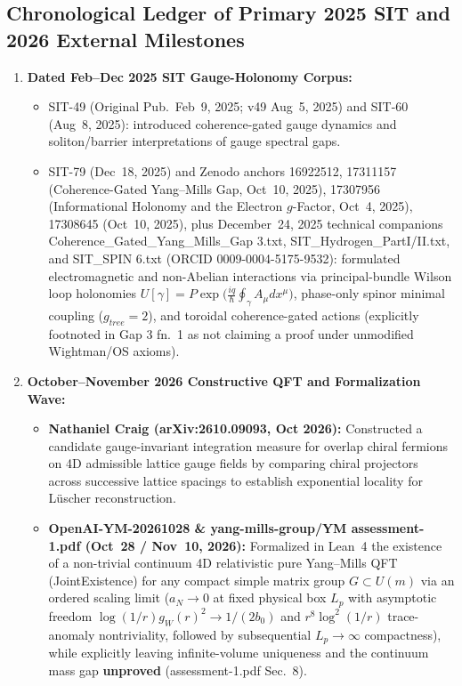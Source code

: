 \documentclass[american,11pt,letterpaper]{article}
\def\mathcal#1{#1}%
\def\mathrm#1{#1}%
\def\texttt#1{#1}%
\def\emph#1{#1}%
\begin{document}
\subsection{Chronological Ledger of Primary 2025 SIT and 2026 External Milestones}

\begin{enumerate}[leftmargin=2em]
  \item \textbf{Dated Feb--Dec 2025 SIT Gauge-Holonomy Corpus:}
  \begin{itemize}
    \item \texttt{SIT-49} (Original Pub.\ Feb~9, 2025; v49 Aug~5, 2025) and \texttt{SIT-60} (Aug~8, 2025): introduced coherence-gated gauge dynamics and soliton/barrier interpretations of gauge spectral gaps.
    \item \texttt{SIT-79} (Dec~18, 2025) and Zenodo anchors \texttt{16922512}, \texttt{17311157} (\emph{Coherence-Gated Yang--Mills Gap}, Oct~10, 2025), \texttt{17307956} (\emph{Informational Holonomy and the Electron $g$-Factor}, Oct~4, 2025), \texttt{17308645} (Oct~10, 2025), plus December~24, 2025 technical companions \texttt{Coherence\_\allowbreak{}Gated\_\allowbreak{}Yang\_\allowbreak{}Mills\_\allowbreak{}Gap 3.\allowbreak{}txt}, \texttt{SIT\_\allowbreak{}Hydrogen\_\allowbreak{}Part\allowbreak{}I/II.\allowbreak{}txt}, and \texttt{SIT\_SPIN 6.txt} (ORCID \texttt{0009-0004-5175-9532}): formulated electromagnetic and non-Abelian interactions via principal-bundle Wilson loop holonomies $U[\gamma] = \mathcal{P}\exp\bigl(\frac{iq}{\hbar}\oint_\gamma A_\mu dx^\mu\bigr)$, phase-only spinor minimal coupling ($g_{\mathrm{tree}} = 2$), and toroidal coherence-gated actions (explicitly footnoted in \texttt{Gap 3} fn.~1 as \emph{not} claiming a proof under unmodified Wightman/OS axioms).
  \end{itemize}
  \item \textbf{October--November 2026 Constructive QFT and Formalization Wave:}
  \begin{itemize}
    \item \textbf{Nathaniel Craig (\texttt{arXiv:2610.09093}, Oct 2026):} Constructed a candidate gauge-invariant integration measure for overlap chiral fermions on 4D admissible lattice gauge fields by comparing chiral projectors across successive lattice spacings to establish exponential locality for L\"uscher reconstruction.
    \item \textbf{\texttt{OpenAI-YM-20261028} \& \texttt{yang-mills-group/YM} \texttt{assessment-1.pdf} (Oct~28 / Nov~10, 2026):} Formalized in Lean~4 the existence of a non-trivial continuum 4D relativistic pure Yang--Mills QFT (\texttt{JointExistence}) for any compact simple matrix group $G \subset U(m)$ via an ordered scaling limit ($a_N \to 0$ at fixed physical box $L_p$ with asymptotic freedom $\log(1/r)g_W(r)^2 \to 1/(2b_0)$ and $r^8\log^2(1/r)$ trace-anomaly nontriviality, followed by subsequential $L_p \to \infty$ compactness), while explicitly leaving infinite-volume uniqueness and the continuum mass gap \textbf{unproved} (\texttt{assessment-1.pdf} Sec.~8).

\end{itemize}
\end{enumerate}
\end{document}
